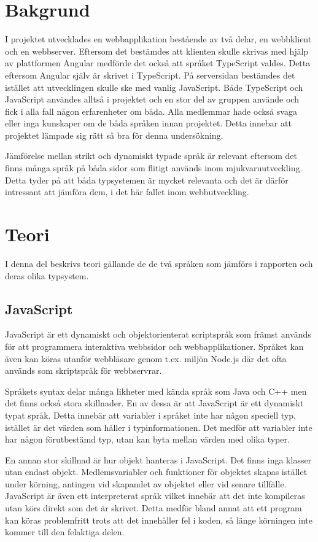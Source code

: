\section{Bakgrund}
I projektet utvecklades en webbapplikation bestående av två delar, en webbklient och en webbserver. Eftersom det bestämdes att klienten skulle skrivas med hjälp av plattformen Angular medförde det också att språket TypeScript valdes. Detta eftersom Angular själv är skrivet i TypeScript. På serversidan bestämdes det istället att utvecklingen skulle ske med vanlig JavaScript. Både TypeScript och JavaScript användes alltså i projektet och en stor del av gruppen använde och fick i alla fall någon erfarenheter om båda. Alla medlemmar hade också svaga eller inga kunskaper om de båda språken innan projektet. Detta innebar att projektet lämpade sig rätt så bra för denna undersökning.

Jämförelse mellan strikt och dynamiskt typade språk är relevant eftersom det finns många språk på båda sidor som flitigt används inom mjukvaruutveckling. Detta tyder på att båda typsystemen är mycket relevanta och det är därför intressant att jämföra dem, i det här fallet inom webbutveckling.
\section{Teori}
I denna del beskrivs teori gällande de de två språken som jämförs i rapporten och deras olika typsystem.
\subsection{JavaScript}
JavaScript är ett dynamiskt och objektorienterat scriptspråk som främst används för att programmera interaktiva webbsidor och webbapplikationer. Språket kan även kan köras utanför webbläsare genom t.ex. miljön Node.js där det ofta används som skriptspråk för webbservrar. \cite{henrik_js1}

Språkets syntax delar många likheter med kända språk som Java och C++ men det finns också stora skillnader. En av dessa är att JavaScript är ett dynamiskt typat språk. Detta innebär att variabler i språket inte har någon speciell typ, istället är det värden som håller i typinformationen. Det medför att variabler inte har någon förutbestämd typ, utan kan byta mellan värden med olika typer. \cite{henrik_js2}

En annan stor skillnad är hur objekt hanteras i JavaScript. Det finns inga klasser utan endast objekt. Medlemsvariabler och funktioner för objektet skapas istället under körning, antingen vid skapandet av objektet eller vid senare tillfälle. \cite{henrik_js3}
JavaScript är även ett interpreterat språk \cite{henrik_js1} vilket innebär att det inte kompileras utan körs direkt som det är skrivet. Detta medför bland annat att ett program kan köras problemfritt trots att det innehåller fel i koden, så länge körningen inte kommer till den felaktiga delen.
